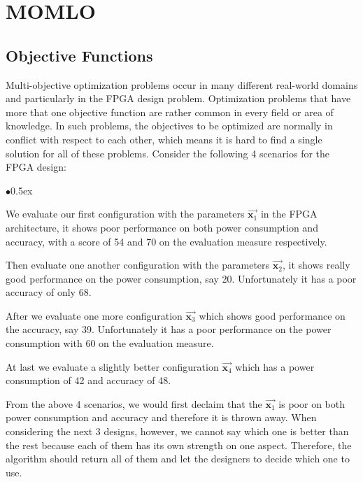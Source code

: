 \documentclass[11pt, runningheads,a4paper]{llncs}
\begin{document}

%
\section{MOMLO}
\subsection{Objective Functions}
Multi-objective optimization problems occur in many different real-world domains and particularly in the FPGA design problem. Optimization problems that have more that one objective function are rather common in every field or area of knowledge. In such problems, the objectives to be optimized are normally in conflict with respect to each other, which means it is hard to find a single solution for all of these problems. Consider the following 4 scenarios for the FPGA design:
\begin{list}{$\bullet$}{\itemsep 0.5ex}
\item We evaluate our first configuration with the parameters $\vec{\mathbf{x}_1}$ in the FPGA architecture, it shows poor performance on both power consumption and accuracy, with a score of 54 and 70 on the evaluation measure respectively. 
\item Then evaluate one another configuration with the parameters $\vec{\mathbf{x}_2}$, it shows really good performance on the power consumption, say 20. Unfortunately it has a poor accuracy of only 68. 
\item After we evaluate one more configuration $\vec{\mathbf{x}_3}$ which shows good performance on the accuracy, say 39. Unfortunately it has a poor performance on the power consumption with 60 on the evaluation measure. 
\item At last we evaluate a slightly better configuration $\vec{\mathbf{x}_4}$ which has a power consumption of 42 and  accuracy of 48. 
\end{list}

From the above 4 scenarios, we would first declaim that the $\vec{\mathbf{x}_1}$ is poor on both power consumption and accuracy and therefore it is thrown away. When considering the next 3 designs, however, we cannot say which one is better than the rest because each of them has its own strength on one aspect. Therefore, the algorithm should return all of them and let the designers to decide which one to use.
\end{document}
